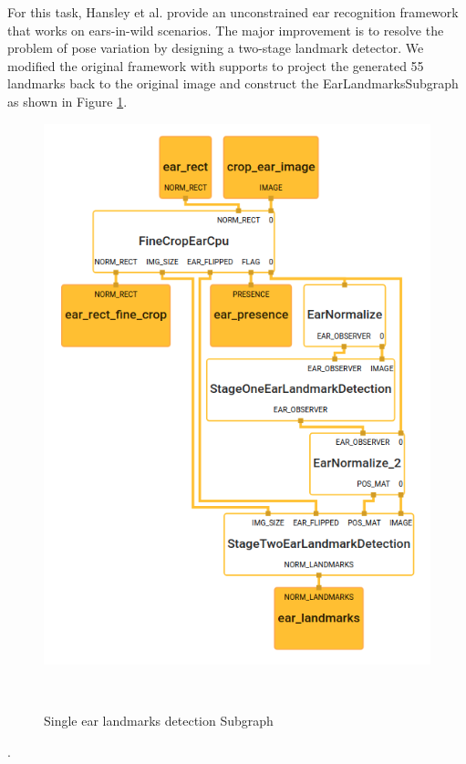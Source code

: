 For this task, Hansley et al.\cite{hansley2018employing} provide an unconstrained ear recognition framework that works on ears-in-wild scenarios. The major improvement is to resolve the problem of pose variation by designing a two-stage landmark detector. We modified the original framework with supports to project the generated 55 landmarks back to the original image and construct the EarLandmarksSubgraph as shown in Figure \ref{fig:graph-ear-landmarks}.
 \begin{figure}
   \centering
     \includegraphics[width=0.9\columnwidth]{figures/graph-ear-landmarks.png}
     \caption{Single ear landmarks detection Subgraph}~\label{fig:graph-ear-landmarks}
   \end{figure}. 
   
